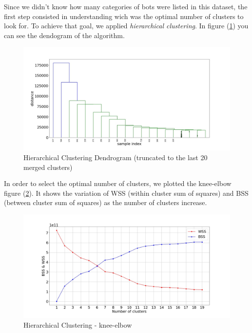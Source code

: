 \normalsize
\clearpage

Since we didn't know how many categories of bots were listed in this dataset, the first step consisted in understanding wich was the optimal number of clusters to look for. To achieve that goal, we applied \textit{hierarchical clustering}. In figure (\ref{fig:dendogram}) you can see the dendogram of the algorithm.


\begin{figure}
	\includegraphics[width=\linewidth]{chapter3/figure/dendogram.jpg}
	\caption{Hierarchical Clustering Dendrogram (truncated to the last 20 merged clusters)}
	\label{fig:dendogram}
\end{figure}

In order to select the optimal number of clusters, we plotted the knee-elbow figure (\ref{fig:kneeelbow}). It shows the variation of WSS (within cluster sum of squares) and BSS (between cluster sum of squares) as the number of clusters increase.\\

\begin{figure} [htp!]
	\includegraphics[width=\linewidth]{chapter3/figure/kneeelbow.jpg}
	\caption{Hierarchical Clustering - knee-elbow}
	\label{fig:kneeelbow}
\end{figure}


